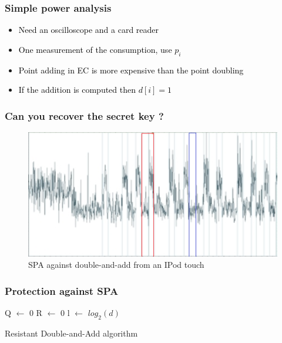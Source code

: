 \documentclass{beamer}
\begin{document}
\begin{frame}
    \frametitle{Simple power analysis}
    \begin{itemize}
        \item \textcolor{black} {Need an oscilloscope and a card reader}
	\item \textcolor{black} {One measurement of the consumption, use $p_{i}$} 
	\item \textcolor{black} {Point adding  in EC is more expensive than the point doubling} 
	\item \textcolor{black} {If the addition is computed then $d[i] = 1$}
    \end{itemize}
\end{frame}

\begin{frame}
    \frametitle{Can you recover the secret key ?}
    \begin{figure}
        \centering
        \includegraphics[scale=0.6]{img/spa.png}
        \caption{SPA against double-and-add from an IPod touch}
    \end{figure}
\end{frame}

\begin{frame}
    \frametitle{Protection against SPA}
\begin{algorithm}[H]
    \footnotesize
    \SetAlgoLined %
   
    \SetSideCommentLeft 
    \SetNoFillComment

    
    
    Q $\leftarrow$ 0\;
    R $\leftarrow$ 0\;
    l $\leftarrow$ $log_2(d)$\;

    \bigskip

    \caption{Resistant Double-and-Add algorithm}
    \label{resistent-daa}
\end{algorithm}
\end{frame}
\end{document}
